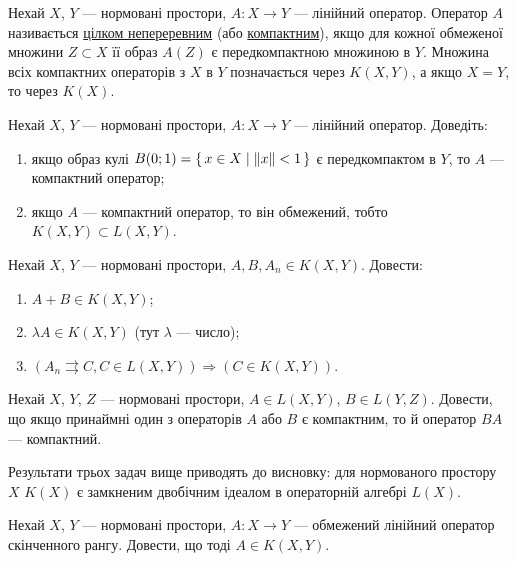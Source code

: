 
\begin{theory}
    Нехай $X$, $Y$ --- нормовані простори, $A: X \to Y$ --- лінійний оператор.
    Оператор $A$ називається \ul{цілком непереревним} (або \ul{компактним}),
    якщо для кожної обмеженої множини $Z \subset X$ її образ $A(Z)$ є передкомпактною
    множиною в $Y$. 
    Множина всіх компактних операторів з $X$ в $Y$ позначається через 
    $K(X,Y)$, а якщо $X = Y$, то через $K(X)$.
\end{theory}

\begin{exercise}
    Нехай $X$, $Y$ --- нормовані простори, $A: X \to Y$ --- лінійний оператор. Доведіть:
    \begin{enumerate}
        \item якщо образ кулі $B(0;1) = \set{x \in X \mid \left\lVert x\right\rVert < 1}$ є передкомпактом в $Y$, то $A$ --- компактний оператор;
        \item якщо $A$ --- компактний оператор, то він обмежений, тобто $K(X,Y) \subset L(X,Y)$.
    \end{enumerate}
\end{exercise}

\begin{exercise}
    Нехай $X$, $Y$ --- нормовані простори, $A, B, A_n \in K(X,Y)$. Довести:
    \begin{enumerate}
        \item $A+B \in K(X, Y)$;
        \item $\lambda A \in K(X, Y)$ (тут $\lambda$ --- число);
        \item $\left( A_n \rightrightarrows C, C\in L(X, Y)\right) \Rightarrow \left( C \in K(X, Y)\right)$.
    \end{enumerate}
\end{exercise}

\begin{exercise}
    Нехай $X$, $Y$, $Z$ --- нормовані простори, $A \in L(X, Y)$, $B \in L(Y, Z)$.
    Довести, що якщо принаймні один з операторів $A$ або $B$ є компактним, то й оператор $BA$ --- компактний.
\end{exercise}

\begin{theory}
    Результати трьох задач вище приводять до висновку: для нормованого простору $X$ $K(X)$ 
    є замкненим двобічним ідеалом в операторній алгебрі $L(X)$.
\end{theory}

\begin{exercise}
    Нехай $X$, $Y$ --- нормовані простори, $A: X \to Y$ --- обмежений лінійний оператор
    скінченного рангу. Довести, що тоді $A \in K(X, Y)$.
\end{exercise}

